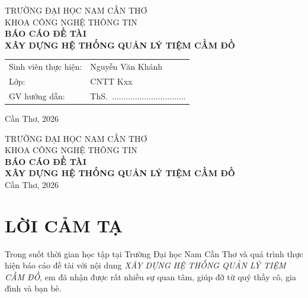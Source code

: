 \documentclass[13pt,a4paper]{extreport}
\newcommand{\TenDeTai}{XÂY DỰNG HỆ THỐNG QUẢN LÝ TIỆM CẦM ĐỒ}
\newcommand{\Khoa}{CÔNG NGHỆ THÔNG TIN}
\newcommand{\Truong}{TRƯỜNG ĐẠI HỌC NAM CẦN THƠ}
\newcommand{\SVOne}{Nguyễn Văn Khánh}
\newcommand{\Lop}{CNTT Kxx}
\newcommand{\GVHD}{ThS.\ ................................}
\begin{document}
\begin{titlepage}
  \begin{center}
    {\large \Truong}\\[6pt]
    {\large KHOA \Khoa}\\[3cm]

    {\Large\bfseries BÁO CÁO ĐỀ TÀI}\\[1cm]
    {\Large\bfseries \TenDeTai}\\[3cm]

    \begin{tabular}{ll}
      Sinh viên thực hiện: & \SVOne \\
      Lớp:                 & \Lop \\
      GV hướng dẫn:        & \GVHD \\
    \end{tabular}

    \vfill
    {\large Cần Thơ, 2026}
  \end{center}
\end{titlepage}

\begin{titlepage}
  \begin{center}
    {\large \Truong}\\[6pt]
    {\large KHOA \Khoa}\\[3cm]

    {\Large\bfseries BÁO CÁO ĐỀ TÀI}\\[1cm]
    {\Large\bfseries \TenDeTai}\\[3cm]

    \vfill
    {\large Cần Thơ, 2026}
  \end{center}
\end{titlepage}


\chapter*{LỜI CẢM TẠ}

Trong suốt thời gian học tập tại Trường Đại học Nam Cần Thơ và quá trình thực hiện báo cáo đề tài với nội dung \emph{\TenDeTai}, em đã nhận được rất nhiều sự quan tâm, giúp đỡ từ quý thầy cô, gia đình và bạn bè.
\end{document}
